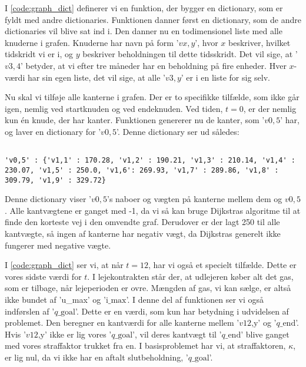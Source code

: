 I \autoref{code:graph_dict} definerer vi en funktion, der bygger en dictionary, som er fyldt med andre dictionaries. Funktionen danner først en dictionary, som de andre dictionaries vil blive sat ind i.
Den danner nu en todimensionel liste med alle knuderne i grafen. Knuderne har navn på form '$vx,y$', hvor $x$ beskriver, hvilket tidskridt vi er i, og $y$ beskriver beholdningen til dette tidsskridt. Det vil sige, at '$v3,4$' betyder, at vi efter tre måneder har en beholdning på fire enheder. Hver $x$-værdi har sin egen liste, det vil sige, at alle '$v3,y$' er i en liste for sig selv.

Nu skal vi tilføje alle kanterne i grafen. Der er to specifikke tilfælde, som ikke går igen, nemlig ved startknuden og ved endeknuden. Ved tiden, $t=0$, er der nemlig kun én knude, der har kanter. Funktionen genererer nu de kanter, som '$v0,5$' har, og laver en dictionary for '$v0,5$'. 
Denne dictionary ser ud således:

\begin{lstlisting}[label=code:q05, caption=Dictionary for $v \textrm{0,5}$.]

'v0,5' : {'v1,1' : 170.28, 'v1,2' : 190.21, 'v1,3' : 210.14, 'v1,4' : 230.07, 'v1,5' : 250.0, 'v1,6': 269.93, 'v1,7' : 289.86, 'v1,8' : 309.79, 'v1,9' : 329.72}
\end{lstlisting}
Denne dictionary viser '$v0,5$'s naboer og vægten på kanterne mellem dem og $v0,5$. Alle kantvægtene er ganget med -1, da vi så kan bruge Dijkstras algoritme til at finde den korteste vej i den omvendte graf. Derudover er der lagt 250 til alle kantvægte, så ingen af kanterne har negativ vægt, da Dijkstras generelt ikke fungerer med negative vægte. 

I \autoref{code:graph_dict} ser vi, at når $t=12$, har vi også et specielt tilfælde. Dette er vores sidste værdi for $t$. I lejekontrakten står der, at udlejeren køber alt det gas, som er tilbage, når lejeperioden er ovre. Mængden af gas, vi kan sælge, er altså ikke bundet af 'u\_max' og '$\textrm{i\_max}$'. I denne del af funktionen ser vi også indførslen af '$q\textrm{\_goal}$'. Dette er en værdi, som kun har betydning i udvidelsen af problemet. Den beregner en kantværdi for alle kanterne mellem '$v\textrm{12,y}$' og '$q\textrm{\_end}$'. Hvis '$v\textrm{12,y}$' ikke er lig vores '$q\textrm{\_goal}$', vil deres kantvægt til '$q\textrm{\_end}$' blive ganget med vores straffaktor trukket fra en. I basisproblemet har vi, at straffaktoren, $\kappa$, er lig nul, da vi ikke har en aftalt slutbeholdning, '$q\textrm{\_goal}$'.

